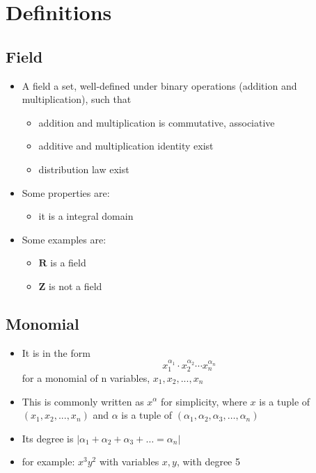 \documentclass[11pt]{article}
\begin{document}

\section{Definitions}

\subsection{Field}
\begin{itemize}
    \item A field a set, well-defined under binary operations (addition and multiplication), such that 
    \begin{itemize}
        \item addition and multiplication is commutative, associative
        \item additive and multiplication identity exist
        \item distribution law exist
    \end{itemize}
    \item Some properties are: 
    \begin{itemize}
        \item it is a integral domain
    \end{itemize}
    \item Some examples are: 
    \begin{itemize}
        \item $\mathbf{R}$ is a field
        \item $\mathbf{Z}$ is not a field
    \end{itemize}
\end{itemize} 

\subsection{Monomial}
\begin{itemize}
    \item It is in the form $$x_1^{\alpha_1} \cdot x_2^{\alpha_2} \cdots x_n^{\alpha_n}$$ for a monomial of n variables, $x_1, x_2,..., x_n$
    \item This is commonly written as $x^\alpha$ for simplicity, where $x$ is a tuple of $(x_1, x_2,..., x_n)$ and $\alpha$ is a tuple of $(\alpha_1, \alpha_2,\alpha_3,\dots, \alpha_n)$
    \item Its degree is $|\alpha_1 + \alpha_2 + \alpha_3 + \dots = \alpha_n|$
    \item for example: $x^3y^2$ with variables $x, y$, with degree 5
\end{itemize} 
\end{document}
